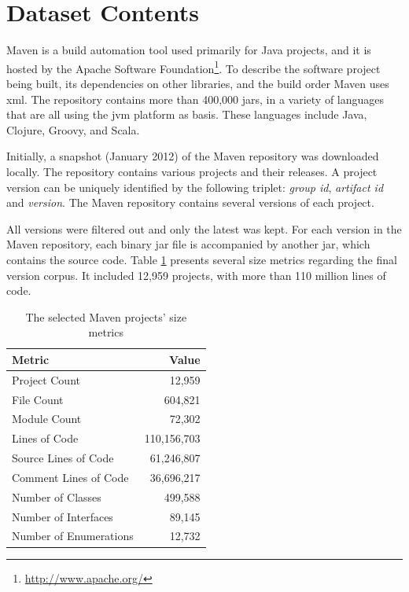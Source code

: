 \documentclass{sig-alternate}
\begin{document}
\section{Dataset Contents}
\label{sec:data}

 Maven is a build automation tool used primarily for Java projects, and it is hosted by the Apache Software Foundation\footnote{\url{http://www.apache.org/}}. To describe the software project being built, its dependencies on other libraries, and the build order Maven uses {\sc xml}. The repository contains more than 400,000 {\sc jar}s, in a variety of languages that are all using the {\sc jvm} platform as basis. These languages include Java, Clojure, Groovy, and Scala.

Initially, a snapshot (January 2012) of the Maven repository was downloaded locally. The repository contains various projects and their releases. A project version can be uniquely identified by the following triplet: {\it group id}, {\it artifact id} and {\it version}. The Maven repository contains several versions of each project.

All versions were filtered out and only the latest was kept. For each version in the Maven repository, each binary {\sc jar} file is accompanied by another {\sc jar}, which contains the source code. Table \ref{tbl:oss-size-metrics} presents several size metrics regarding the final version corpus. It included 12,959 projects, with more than 110 million lines of code.

\begin{table}
\centering
\caption{The selected Maven projects' size metrics}
\label{tbl:oss-size-metrics}
\begin{tabular}{l r}
 \hline
\textbf{Metric} & \textbf{Value}\\
\hline
Project Count & 12,959\\
File Count & 604,821\\
Module Count & 72,302\\
Lines of Code & 110,156,703\\
Source Lines of Code & 61,246,807\\
Comment Lines of Code & 36,696,217\\
Number of Classes & 499,588\\
Number of Interfaces & 89,145\\
Number of Enumerations & 12,732\\
\hline
\end{tabular}
\end{table}
\end{document}

